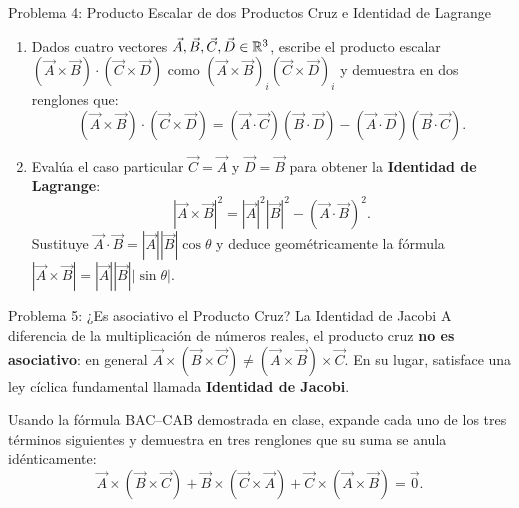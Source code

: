 \documentclass[11pt,letterpaper]{article}
\begin{document}
\begin{infobox}{Problema 4: Producto Escalar de dos Productos Cruz e Identidad de Lagrange}
\begin{enumerate}[label=(\alph*)]
    \item Dados cuatro vectores $\vec{A}, \vec{B}, \vec{C}, \vec{D} \in \mathbb{R}^3$, escribe el producto escalar $(\vec{A}\times\vec{B})\cdot(\vec{C}\times\vec{D})$ como $(\vec{A}\times\vec{B})_i (\vec{C}\times\vec{D})_i$ y demuestra en dos renglones que:
    \[
    (\vec{A} \times \vec{B}) \cdot (\vec{C} \times \vec{D}) = (\vec{A}\cdot\vec{C})(\vec{B}\cdot\vec{D}) - (\vec{A}\cdot\vec{D})(\vec{B}\cdot\vec{C}).
    \]
    \item Evalúa el caso particular $\vec{C} = \vec{A}$ y $\vec{D} = \vec{B}$ para obtener la \textbf{Identidad de Lagrange}:
    \[
    |\vec{A} \times \vec{B}|^2 = |\vec{A}|^2|\vec{B}|^2 - (\vec{A}\cdot\vec{B})^2.
    \]
    Sustituye $\vec{A}\cdot\vec{B} = |\vec{A}||\vec{B}|\cos\theta$ y deduce geométricamente la fórmula $|\vec{A}\times\vec{B}| = |\vec{A}||\vec{B}||\sin\theta|$.
\end{enumerate}
\end{infobox}

\begin{infobox}{Problema 5: ¿Es asociativo el Producto Cruz? La Identidad de Jacobi}
A diferencia de la multiplicación de números reales, el producto cruz \textbf{no es asociativo}: en general $\vec{A}\times(\vec{B}\times\vec{C}) \neq (\vec{A}\times\vec{B})\times\vec{C}$. En su lugar, satisface una ley cíclica fundamental llamada \textbf{Identidad de Jacobi}.

Usando la fórmula BAC--CAB demostrada en clase, expande cada uno de los tres términos siguientes y demuestra en tres renglones que su suma se anula idénticamente:
\[
\vec{A}\times(\vec{B}\times\vec{C}) + \vec{B}\times(\vec{C}\times\vec{A}) + \vec{C}\times(\vec{A}\times\vec{B}) = \vec{0}.
\]
\end{infobox}

\end{document}
